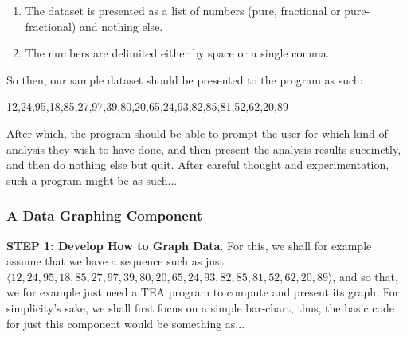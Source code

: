 \documentclass[a4paper, 18pt]{book} %
\begin{document}
\begin{enumerate}
\item The dataset is presented as a list of numbers (pure, fractional or pure-fractional\cite{Lutalo2024gtnc}) and nothing else.
\item The numbers are delimited either by space or a single comma.
\end{enumerate}

So then, our sample dataset should be presented to the program as such:


  \begin{tcolorbox}[title=Sample Well-formatted INPUT Dataset of 20 Random Numbers (Ages),  breakable,listing options={basicstyle=\ttfamily, breaklines=true, breakatwhitespace=true}]
12,24,95,18,85,27,97,39,80,20,65,24,93,82,85,81,52,62,20,89
  \end{tcolorbox}


After which, the program should be able to prompt the user for which kind of analysis they wish to have done, and then present the analysis results succinctly, and then do nothing else but quit. After careful thought and experimentation, such a program might be as such...

\vspace{2em}

\subsubsection{A Data Graphing Component}

\textbf{STEP 1: Develop How to Graph Data}. For this, we shall for example assume that we have a sequence such as just $\langle 12, 24, 95, 18, 85, 27, 97, 39, 80, 20, 65, 24, 93, 82, 85, 81, 52, 62, 20, 89 \rangle$, and so that, we for example just need a TEA program to compute and present its graph. For simplicity's sake, we shall first focus on a simple bar-chart, thus, the basic code for just this component would be something as...
\end{document}
